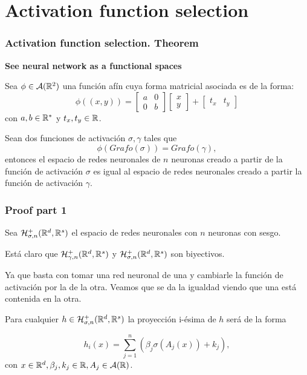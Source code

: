 \section{Activation function selection}
\begin{frame}
    \frametitle{Activation function selection. Theorem}

    \textbf{See neural network as a functional spaces}

    Sea $\phi \in \mathcal{A}(\mathbb{R}^2)$ una función afín 
    cuya forma matricial asociada es de la forma:  
    \begin{equation}
        \phi((x,y)) =  
        \begin{bmatrix}
            a & 0 \\
             0& b 
        \end{bmatrix}
        \begin{bmatrix}
            x \\
            y
        \end{bmatrix}
        +
        \begin{bmatrix}
            t_x  & t_y
        \end{bmatrix}
    \end{equation}
    con $a,b \in \mathbb{R}^*$ y $t_x, t_y \in \mathbb{R}$.

    
    Sean dos funciones de activación $\sigma, \gamma$ tales que 
    \begin{equation*}
        \phi(Grafo(\sigma)) = Grafo(\gamma),
    \end{equation*}
    entonces 
    el espacio de redes neuronales de $n$ neuronas creado a partir de la función de activación $\sigma$ es  
    igual al espacio de redes neuronales creado a partir la función de activación $\gamma$. 
\end{frame}

\begin{frame}
    \frametitle{Proof part 1}
    Sea $\mathcal{H}^+_{\sigma, n}(\mathbb{R}^d, \mathbb{R}^s)$ el espacio de redes neuronales con $n$ neuronas con sesgo. 

    Está claro que 
    $\mathcal{H}^+_{\gamma, n}(\mathbb{R}^d, \mathbb{R}^s)$ 
        y 
        $\mathcal{H}^+_{\sigma, n}(\mathbb{R}^d, \mathbb{R}^s)$ 
        son biyectivos.
   
    Ya que basta con tomar una red neuronal de una y cambiarle la función de activación por la de la otra. 
    Veamos 
    que se da la igualdad viendo que una está contenida en la otra. 

    Para cualquier $h  \in \mathcal{H}^+_{\sigma, n}(\mathbb{R}^d, \mathbb{R}^s)$
    la proyección i-ésima de $h$ será de la forma 

    \begin{equation*}
        h_i(x) = \sum^n_{j=1}(\beta_{j} \sigma(A_j(x))+ k_j),
    \end{equation*}
    con $x \in \mathbb{R}^d, \beta_{j}, k_j \in \mathbb{R}, A_j \in \mathcal{A}(\mathbb{R})$. 
\end{frame}

